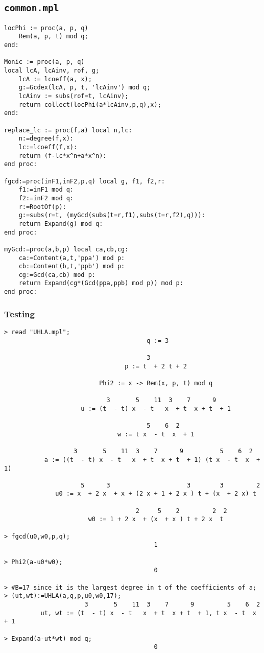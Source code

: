 \documentclass[10pt]{report}
\theoremstyle{plain}
\theoremstyle{definition}
\begin{document}
\subsection*{\tt{common.mpl}}
\begin{verbatim}
locPhi := proc(a, p, q)
    Rem(a, p, t) mod q;
end:

Monic := proc(a, p, q)
local lcA, lcAinv, rof, g;
    lcA := lcoeff(a, x);
    g:=Gcdex(lcA, p, t, 'lcAinv') mod q;
    lcAinv := subs(rof=t, lcAinv);
    return collect(locPhi(a*lcAinv,p,q),x);
end:

replace_lc := proc(f,a) local n,lc:
    n:=degree(f,x):
    lc:=lcoeff(f,x):
    return (f-lc*x^n+a*x^n):
end proc:

fgcd:=proc(inF1,inF2,p,q) local g, f1, f2,r:
    f1:=inF1 mod q:
    f2:=inF2 mod q:
    r:=RootOf(p):
    g:=subs(r=t, (myGcd(subs(t=r,f1),subs(t=r,f2),q))):
    return Expand(g) mod q:
end proc:

myGcd:=proc(a,b,p) local ca,cb,cg:
    ca:=Content(a,t,'ppa') mod p:
    cb:=Content(b,t,'ppb') mod p:
    cg:=Gcd(ca,cb) mod p:
    return Expand(cg*(Gcd(ppa,ppb) mod p)) mod p:
end proc:
\end{verbatim}

\clearpage
\subsubsection*{Testing}
\begin{verbatim}
> read "UHLA.mpl";
                                       q := 3

                                       3
                                 p := t  + 2 t + 2

                          Phi2 := x -> Rem(x, p, t) mod q

                            3       5    11  3    7      9
                     u := (t  - t) x  - t   x  + t  x + t  + 1

                                       5    6  2
                               w := t x  - t  x  + 1

                   3       5    11  3    7      9          5    6  2
           a := ((t  - t) x  - t   x  + t  x + t  + 1) (t x  - t  x  + 1)

                     5      3                     3        3         2
              u0 := x  + 2 x  + x + (2 x + 1 + 2 x ) t + (x  + 2 x) t

                                    2     5    2         2  2
                       w0 := 1 + 2 x  + (x  + x ) t + 2 x  t

> fgcd(u0,w0,p,q);
                                         1

> Phi2(a-u0*w0);           
                                         0

> #B=17 since it is the largest degree in t of the coefficients of a;
> (ut,wt):=UHLA(a,q,p,u0,w0,17);
                      3       5    11  3    7      9         5    6  2
          ut, wt := (t  - t) x  - t   x  + t  x + t  + 1, t x  - t  x  + 1

> Expand(a-ut*wt) mod q;
                                         0

\end{verbatim}
\clearpage
\end{document}

